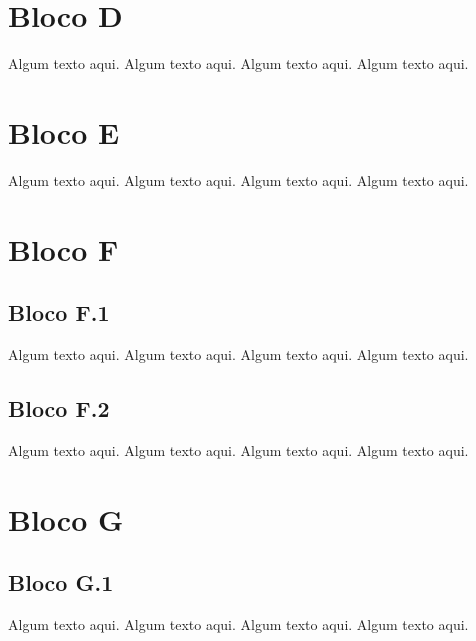 \section{Bloco D}

\begin{remark}
Algum texto aqui. Algum texto aqui. Algum texto aqui. Algum texto aqui. 
\end{remark}

\section{Bloco E}

\begin{corollary}[Nome]
Algum texto aqui. Algum texto aqui. Algum texto aqui. Algum texto aqui. 
\end{corollary}

\section{Bloco F}

\subsection{Bloco F.1}

\begin{proposition}[Nome]
Algum texto aqui. Algum texto aqui. Algum texto aqui. Algum texto aqui. 
\end{proposition}

\subsection{Bloco F.2}

\begin{proposition} 
Algum texto aqui. Algum texto aqui. Algum texto aqui. Algum texto aqui. 
\end{proposition}

\section{Bloco G}

\subsection{Bloco G.1}

\begin{example}
Algum texto aqui. Algum texto aqui. Algum texto aqui. Algum texto aqui. 
\end{example}

